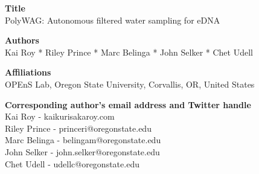 \documentclass[11pt, letterpaper]{article}
\begin{document}
\begin{flushleft}



\setlength{\parindent}{0pt}
\setlength{\parskip}{10pt}
  

%
%
\textbf{Title} \\
PolyWAG: Autonomous filtered water sampling for eDNA 

%
%
\textbf{Authors} \\
Kai Roy * Riley Prince * Marc Belinga * John Selker * Chet Udell

%
%
\textbf{Affiliations} \\ 
OPEnS Lab, Oregon State University, Corvallis, OR, United States


%
%
\textbf{Corresponding author’s email address and Twitter handle}\\ 
Kai Roy - kaikurisakaroy\@gmail.com \\
Riley Prince - princeri@oregonstate.edu \\
Marc Belinga - belingam@oregonstate.edu  \\
John Selker - john.selker@oregonstate.edu \\
Chet Udell - udellc@oregonstate.edu



\end{flushleft}
\end{document}
